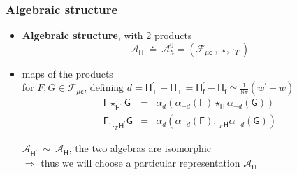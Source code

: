 \documentclass[9pt]{beamer}
\newcommand{\Acal}{\mathcal{A}}
\newcommand{\Fcal}{\mathcal{F}}
\newcommand{\Fsf}{\mathsf{F}}
\newcommand{\Gsf}{\mathsf{G}}
\newcommand{\Hsf}{\mathsf{H}}
\newcommand{\csf}{\mathsf{c}}
\newcommand{\fsf}{\mathsf{f}}
\begin{document}
\begin{frame}

\frametitle{Algebraic structure}

\begin{itemize}
 
\item \textbf{Algebraic structure}, with 2 products
\vspace*{-2pt}
\begin{equation*}
\Acal_\Hsf \ \doteq \ \Acal^0_\hbar = \left( \Fcal_{\mu\csf} \ , \ \star , \cdot_T \right)
\end{equation*}

\item maps of the products \\
for $F, G \in \Fcal_{\mu\csf}$, defining $d = \Hsf_+^\prime - \Hsf_+ = \Hsf_\fsf^\prime - \Hsf_\fsf \simeq \frac{1}{8\pi}\left( w^\prime - w \right)$
\vspace*{-4pt}
\begin{eqnarray*}
\Fsf \star_{\Hsf^\prime} \Gsf &=& \alpha_d \left( \alpha_{-d}(\Fsf) \star_\Hsf \alpha_{-d}(\Gsf) \right) \\ 
\Fsf ._{\cdot_T{\Hsf^\prime}} \Gsf &=& \alpha_d \left( \alpha_{-d}(\Fsf) ._{\cdot_T\Hsf} \alpha_{-d}(\Gsf) \right) 
\end{eqnarray*}

\vspace*{-9pt}

\begin{block}{}
\vspace*{-14pt}
\begin{center}
$\Acal_{\Hsf^\prime} \ \sim \ \Acal_{\Hsf}$, the two algebras are isomorphic \\
$\Rightarrow$ thus we will choose a particular representation $\Acal_{\Hsf}$
\end{center}
\vspace*{-5pt}
\end{block}

\end{itemize}
  
\end{frame}  

\end{document}
